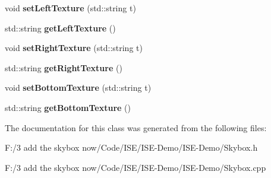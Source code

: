 \begin{DoxyCompactItemize}
\item 
\hypertarget{class_skybox_a64e6265edd09ac4e353c00173a168c3a}{void {\bfseries set\-Left\-Texture} (std\-::string t)}\label{class_skybox_a64e6265edd09ac4e353c00173a168c3a}

\item 
\hypertarget{class_skybox_a8c0ccc0dd31f7ba3c4319a10cb7da3e1}{std\-::string {\bfseries get\-Left\-Texture} ()}\label{class_skybox_a8c0ccc0dd31f7ba3c4319a10cb7da3e1}

\item 
\hypertarget{class_skybox_ab14f5b6cd94a0da3802c01edf2d9f1df}{void {\bfseries set\-Right\-Texture} (std\-::string t)}\label{class_skybox_ab14f5b6cd94a0da3802c01edf2d9f1df}

\item 
\hypertarget{class_skybox_a18be443db453e52f912f71c073f33b3a}{std\-::string {\bfseries get\-Right\-Texture} ()}\label{class_skybox_a18be443db453e52f912f71c073f33b3a}

\item 
\hypertarget{class_skybox_a484fc894c6940c141f5c013606d68249}{void {\bfseries set\-Bottom\-Texture} (std\-::string t)}\label{class_skybox_a484fc894c6940c141f5c013606d68249}

\item 
\hypertarget{class_skybox_a24aa60e0594ce4bc58492222e4d93792}{std\-::string {\bfseries get\-Bottom\-Texture} ()}\label{class_skybox_a24aa60e0594ce4bc58492222e4d93792}

\end{DoxyCompactItemize}


The documentation for this class was generated from the following files\-:\begin{DoxyCompactItemize}
\item 
F\-:/3 add the skybox now/\-Code/\-I\-S\-E/\-I\-S\-E-\/\-Demo/\-I\-S\-E-\/\-Demo/Skybox.\-h\item 
F\-:/3 add the skybox now/\-Code/\-I\-S\-E/\-I\-S\-E-\/\-Demo/\-I\-S\-E-\/\-Demo/Skybox.\-cpp\end{DoxyCompactItemize}

